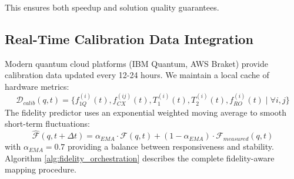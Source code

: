 \documentclass[lettersize,journal]{IEEEtran}
\begin{document}
This ensures both speedup and solution quality guarantees.

\subsection{Real-Time Calibration Data Integration}
\label{subsec:calibration}

Modern quantum cloud platforms (IBM Quantum, AWS Braket) provide calibration data updated every 12-24 hours. We maintain a local cache of hardware metrics:
\begin{equation}
\mathcal{D}_{calib}(q, t) = \{f_{1Q}^{(i)}(t), f_{CX}^{(ij)}(t), T_1^{(i)}(t), T_2^{(i)}(t), f_{RO}^{(i)}(t) \mid \forall i, j\}
\label{eq:calibration_data}
\end{equation}
The fidelity predictor uses an exponential weighted moving average to smooth short-term fluctuations:
\begin{equation}
\hat{\mathcal{F}}(q, t+\Delta t) = \alpha_{EMA} \cdot \mathcal{F}(q, t) + (1 - \alpha_{EMA}) \cdot \mathcal{F}_{measured}(q, t)
\label{eq:fidelity_prediction}
\end{equation}
with $\alpha_{EMA} = 0.7$ providing a balance between responsiveness and stability. Algorithm \ref{alg:fidelity_orchestration} describes the complete fidelity-aware mapping procedure.
\end{document}
